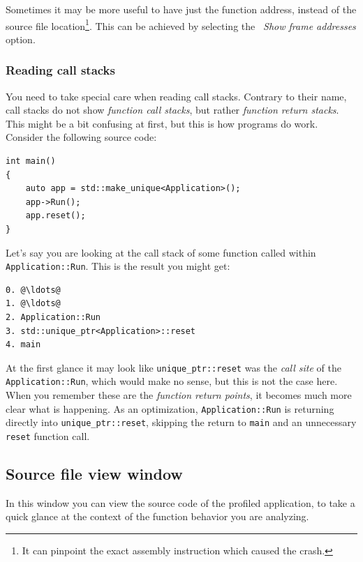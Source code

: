 \documentclass[hidelinks,titlepage,a4paper]{article}
\begin{document}
Sometimes it may be more useful to have just the function address, instead of the source file location\footnote{It can pinpoint the exact assembly instruction which caused the crash.}. This can be achieved by selecting the \emph{\faAt{}~Show frame addresses} option.

\subsubsection{Reading call stacks}

You need to take special care when reading call stacks. Contrary to their name, call stacks do not show \emph{function call stacks}, but rather \emph{function return stacks}. This might be a bit confusing at first, but this is how programs do work. Consider the following source code:

\begin{lstlisting}
int main()
{
    auto app = std::make_unique<Application>();
    app->Run();
    app.reset();
}
\end{lstlisting}

Let's say you are looking at the call stack of some function called within \texttt{Application::Run}. This is the result you might get:

\begin{lstlisting}
0. @\ldots@
1. @\ldots@
2. Application::Run
3. std::unique_ptr<Application>::reset
4. main
\end{lstlisting}

At the first glance it may look like \texttt{unique\_ptr::reset} was the \emph{call site} of the \texttt{Application::Run}, which would make no sense, but this is not the case here. When you remember these are the \emph{function return points}, it becomes much more clear what is happening. As an optimization, \texttt{Application::Run} is returning directly into \texttt{unique\_ptr::reset}, skipping the return to \texttt{main} and an unnecessary \texttt{reset} function call.

\subsection{Source file view window}
\label{sourceview}

In this window you can view the source code of the profiled application, to take a quick glance at the context of the function behavior you are analyzing.
\end{document}
